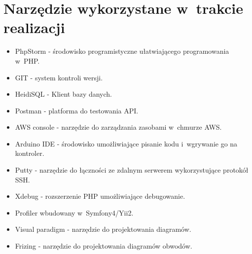 \documentclass[declaration,shortabstract, mgr]{iithesis}
\begin{document}
\section{Narzędzie wykorzystane w~trakcie realizacji}\label{a:narzedzia}
\begin{itemize}
\item PhpStorm - środowisko programistyczne ułatwiającego programowania w~PHP.
\item GIT - system kontroli wersji.
\item HeidiSQL - Klient bazy danych.
\item Postman - platforma do testowania API.
\item AWS console - narzędzie do zarządzania zasobami w~chmurze AWS.
\item Arduino IDE - środowisko umożliwiające pisanie kodu i~wgrywanie go na kontroler.
\item Putty - narzędzie do łączności ze zdalnym serwerem wykorzystujące protokół SSH.
\item Xdebug - rozszerzenie PHP umożliwiające debugowanie.
\item Profiler wbudowany w~Symfony4/Yii2.
\item Visual paradigm - narzędzie do projektowania diagramów.
\item Frizing - narzędzie do projektowania diagramów obwodów.
\end{itemize}
\end{document}

